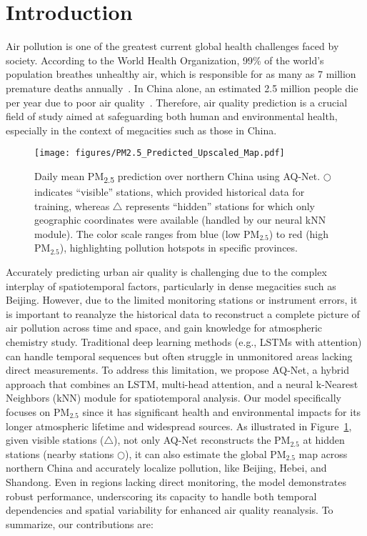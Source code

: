 \section{Introduction}

\label{Introduction}

Air pollution is one of the greatest current global health challenges faced by society. According to the World Health Organization, 99\% of the world’s population breathes unhealthy air, which is responsible for as many as 7 million premature deaths annually~\cite{Lelieveld2020}. In China alone, an estimated 2.5 million people die per year due to poor air quality~\cite{Kulmala2015}. Therefore, air quality prediction is a crucial field of study aimed at safeguarding both human and environmental health, especially in the context of megacities such as those in China. 

\begin{figure}[t]
    \centering
    \texttt{[image: figures/PM2.5\_Predicted\_Upscaled\_Map.pdf]}
    \caption{Daily mean PM\textsubscript{2.5} prediction over northern China using AQ-Net. $\bigcirc$ indicates ``visible'' stations, which provided historical data for training, whereas $\triangle$ represents ``hidden'' stations for which only geographic coordinates were available (handled by our neural kNN module). The color scale ranges from blue (low PM\(_{2.5}\)) to red (high PM\(_{2.5}\)), highlighting pollution hotspots in specific provinces.}
    \label{fig:map_china}
\end{figure}

Accurately predicting urban air quality is challenging due to the complex interplay of spatiotemporal factors, particularly in dense megacities such as Beijing. However, due to the limited monitoring stations or instrument errors, it is important to reanalyze the historical data to reconstruct a complete picture of air pollution across time and space, and gain knowledge for atmospheric chemistry study. Traditional deep learning methods (e.g., LSTMs with attention) can handle temporal sequences but often struggle in unmonitored areas lacking direct measurements. To address this limitation, we propose AQ-Net, a hybrid approach that combines an LSTM, multi-head attention, and a neural k-Nearest Neighbors (kNN) module for spatiotemporal analysis. Our model specifically focuses on PM\(_{2.5}\) since it has significant health and environmental impacts for its longer atmospheric lifetime and widespread sources. As illustrated in Figure~\ref{fig:map_china}, given visible stations ($\triangle$), not only AQ-Net reconstructs the PM\(_{2.5}\) at hidden stations (nearby stations $\bigcirc$), it can also estimate the global PM\(_{2.5}\) map across northern China and accurately localize pollution, like Beijing, Hebei, and Shandong. Even in regions lacking direct monitoring, the model demonstrates robust performance, underscoring its capacity to handle both temporal dependencies and spatial variability for enhanced air quality reanalysis. To summarize, our contributions are:

